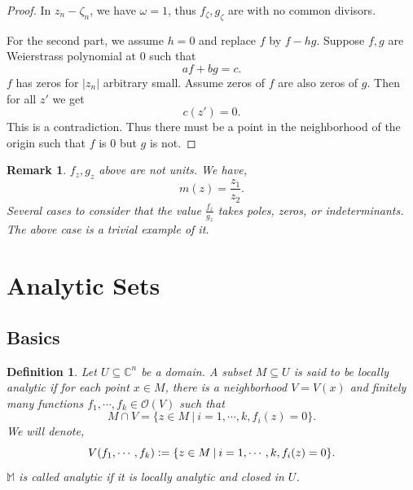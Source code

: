 \documentclass{article}
\newtheorem{definition}{Definition}[section]
\newtheorem{remark}{Remark}[section]
\newcommand{\defeq}{\vcentcolon=}
\newcommand{\C}[0]{\mathbb{C}}
\newcommand{\M}[0]{\mathbb{M}}
\newcommand{\sep}[0]{\:|\:}
\begin{document}
\begin{proof}
  In $z_n-\zeta_n$, we have $\omega = 1$, thus $f_\zeta,g_\zeta$ are with no common divisors. \\
  \par For the second part, we assume $h=0$ and replace $f$ by $f-hg$. Suppose $f,g$ are Weierstrass polynomial at $0$ such that 
  \begin{equation*}
    af+bg = c.
  \end{equation*}
  $f$ has zeros for $\vert z_n\vert $ arbitrary small. Assume zeros of $f$ are also zeros of $g$. Then for all $z'$ we get 
  \begin{equation*}
    c(z') = 0.
  \end{equation*}
  This is a contradiction. Thus there must be a point in the neighborhood of the origin such that $f$ is $0$ but $g$ is not.
\end{proof}

\begin{remark}
  $f_z,g_z$ above are not units. We have,
  \begin{equation*}
    m(z) = {\frac {z_1} {z_2}}.
  \end{equation*}
  Several cases to consider that the value ${\frac {f_z} {g_z}}$ takes poles, zeros, or indeterminants. The above case is a trivial example of it.
\end{remark}

\section{Analytic Sets}

\subsection{Basics}

\begin{definition}
  Let $U\subseteq\C^n$ be a domain. A subset $M\subseteq U$ is said to be locally analytic if for each point $x\in M$, there is a neighborhood $V= V(x)$ and finitely many functions $f_1,\cdots,f_k\in\mathcal{O}(V)$ such that 
  \begin{equation*}
    M\cap V = \{z\in M\sep i=1,\cdots,k, f_i(z)=0\}.
  \end{equation*}
  We will denote,
  \begin{equation*}
  V(f_1,\cdots,f_k) \defeq  \{z\in M\sep i=1,\cdots,k, f_i(z)=0\}.
  \end{equation*}
  $\M$ is called analytic if it is locally analytic and closed in $U$.
\end{definition}
\end{document}
